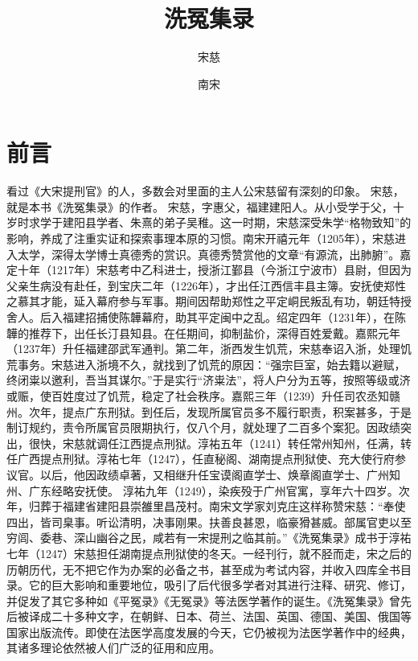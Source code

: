 \documentclass[12pt,UTF8]{ctexbook}
\title{\heiti\zihao{0} 洗冤集录}
\author{宋慈}
\date{南宋}
\begin{document}
\maketitle
\tableofcontents

\frontmatter

\chapter{前言}

看过《大宋提刑官》的人，多数会对里面的主人公宋慈留有深刻的印象。
宋慈，就是本书《洗冤集录》的作者。
宋慈，字惠父，福建建阳人。从小受学于父，十岁时求学于建阳县学者、朱熹的弟子吴稚。这一时期，宋慈深受朱学“格物致知”的影响，养成了注重实证和探索事理本原的习惯。南宋开禧元年（1205年），宋慈进入太学，深得太学博士真德秀的赏识。真德秀赞赏他的文章“有源流，出肺腑”。嘉定十年（1217年）宋慈考中乙科进士，授浙江鄞县（今浙江宁波市）县尉，但因为父亲生病没有赴任，到宝庆二年（1226年），才出任江西信丰县主簿。安抚使郑性之慕其才能，延入幕府参与军事。期间因帮助郑性之平定峒民叛乱有功，朝廷特授舍人。后入福建招捕使陈韡幕府，助其平定闽中之乱。绍定四年（1231年），在陈韡的推荐下，出任长汀县知县。在任期间，抑制盐价，深得百姓爱戴。嘉熙元年（1237年）升任福建邵武军通判。第二年，浙西发生饥荒，宋慈奉诏入浙，处理饥荒事务。宋慈进入浙境不久，就找到了饥荒的原因：“强宗巨室，始去籍以避赋，终闭粜以邀利，吾当其谋尔。”于是实行“济粜法”，将人户分为五等，按照等级或济或赈，使百姓度过了饥荒，稳定了社会秩序。嘉熙三年（1239）升任司农丞知赣州。次年，提点广东刑狱。到任后，发现所属官员多不履行职责，积案甚多，于是制订规约，责令所属官员限期执行，仅八个月，就处理了二百多个案犯。因政绩突出，很快，宋慈就调任江西提点刑狱。淳祐五年（1241）转任常州知州，任满，转任广西提点刑狱。淳祐七年（1247），任直秘阁、湖南提点刑狱使、充大使行府参议官。以后，他因政绩卓著，又相继升任宝谟阁直学士、焕章阁直学士、广州知州、广东经略安抚使。
淳祐九年（1249），染疾殁于广州官寓，享年六十四岁。次年，归葬于福建省建阳县崇雒里昌茂村。南宋文学家刘克庄这样称赞宋慈：“奉使四出，皆司臬事。听讼清明，决事刚果。扶善良甚恩，临豪猾甚威。部属官吏以至穷闾、委巷、深山幽谷之民，咸若有一宋提刑之临其前。”《洗冤集录》成书于淳祐七年（1247）宋慈担任湖南提点刑狱使的冬天。一经刊行，就不胫而走，宋之后的历朝历代，无不把它作为办案的必备之书，甚至成为考试内容，并收入四库全书目录。它的巨大影响和重要地位，吸引了后代很多学者对其进行注释、研究、修订，并促发了其它多种如《平冤录》《无冤录》等法医学著作的诞生。《洗冤集录》曾先后被译成二十多种文字，在朝鲜、日本、荷兰、法国、英国、德国、美国、俄国等国家出版流传。即使在法医学高度发展的今天，它仍被视为法医学著作中的经典，其诸多理论依然被人们广泛的征用和应用。
\end{document}
